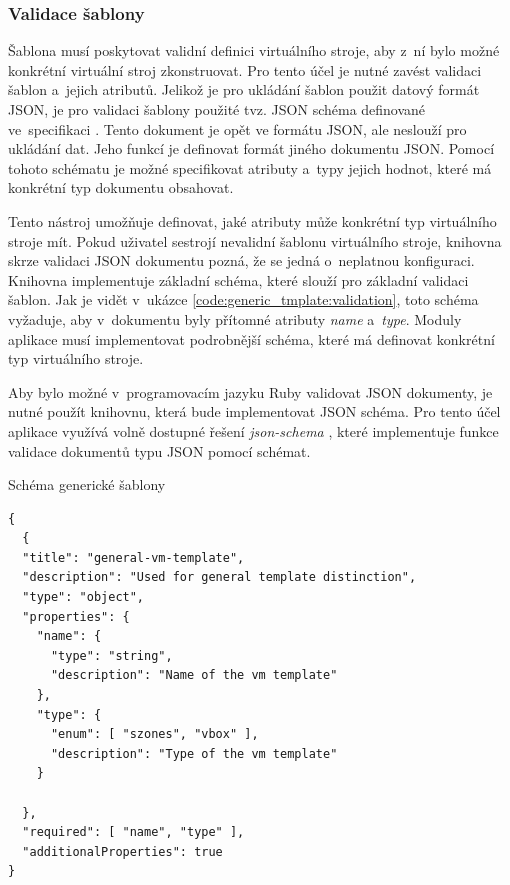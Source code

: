 \subsubsection{Validace šablony}
\label{chapter:implementation:library:generic:validation}
Šablona musí poskytovat validní definici virtuálního stroje, aby z~ní bylo možné konkrétní virtuální stroj zkonstruovat.
Pro tento účel je nutné zavést validaci šablon a~jejich atributů. Jelikož je pro ukládání šablon použit datový formát JSON,
je pro validaci šablony použité tvz. JSON schéma definované ve~specifikaci \cite{json:schema}. Tento dokument je opět ve formátu
JSON, ale neslouží pro ukládání dat. Jeho funkcí je definovat formát jiného dokumentu JSON. Pomocí tohoto schématu
je možné specifikovat atributy a~typy jejich hodnot, které má konkrétní typ dokumentu obsahovat.

Tento nástroj umožňuje definovat, jaké atributy může konkrétní typ virtuálního stroje mít. Pokud uživatel sestrojí
nevalidní šablonu virtuálního stroje, knihovna skrze validaci JSON dokumentu pozná, že se jedná o~neplatnou konfiguraci. Knihovna
implementuje základní schéma, které slouží pro základní validaci šablon. Jak je vidět v~ukázce \ref{code:generic_tmplate:validation},
toto schéma vyžaduje, aby v~dokumentu byly přítomné atributy \textit{name} a~\textit{type}. Moduly aplikace musí implementovat
podrobnější schéma, které má definovat konkrétní typ virtuálního stroje.

Aby bylo možné v~programovacím jazyku Ruby validovat JSON dokumenty, je nutné použít knihovnu, která bude implementovat
JSON schéma. Pro tento účel aplikace využívá volně dostupné řešení \textit{json-schema} \cite{json:schema:ruby}, které implementuje
funkce validace dokumentů typu JSON pomocí schémat.
\begin{listing}[ht]
  \caption{Schéma generické šablony}
  \begin{verbatim}
{
  {
  "title": "general-vm-template",
  "description": "Used for general template distinction",
  "type": "object",
  "properties": {
    "name": {
      "type": "string",
      "description": "Name of the vm template"
    },
    "type": {
      "enum": [ "szones", "vbox" ],
      "description": "Type of the vm template"
    }

  },
  "required": [ "name", "type" ],
  "additionalProperties": true
}  
  \end{verbatim} 
  \label{code:generic_tmplate:validation}
\end{listing}
